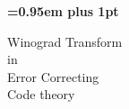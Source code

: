 \documentclass[a4paper,10pt,twoside]{book}
\begin{document}
\begin{titlepage}
%
\pagestyle{empty}
\begingroup
\vspace*{-7\topskip}

\vspace{3 cm}
%
%

\vspace{1cm}
\begin{center}
        {\huge\bf \baselineskip=0.95em plus 1pt \expandafter{
        Winograd Transform \\ in  \\ Error Correcting \\ Code theory
        \par}}
\end{center}






%
\vspace{1 cm}


\end{titlepage}
\end{document}

